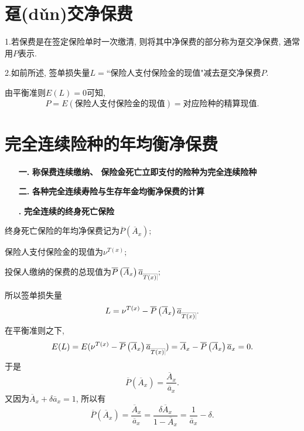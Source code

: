 \documentclass[a4paper,openany, 10pt]{ctexbook}
\makeatletter
\newcommand{\hei}{\CJKfamily{hei}}      %
\DeclareRobustCommand{\annu}[1]{_{%
    \def\arraystretch{0}%
    \setlength\arraycolsep{1pt}%
    \setlength\arrayrulewidth{.2pt}%
    \begin{array}[b]{@{}c|}\hline
        \\[\arraycolsep]%
        \scriptstyle #1%
    \end{array}%
}}
\makeatother
\begin{document}
\section{趸(dǔn)交净保费}
1.若保费是在签定保险单时一次缴清, 则将其中净保费的部分称为趸交净保费, 通常用$P$表示.

2.如前所述, 签单损失量$L=$``保险人支付保险金的现值"减去趸交净保费$P.$

由平衡准则$E(L)=0$可知, $$P=E(\text{保险人支付保险金的现值})=\text{对应险种的精算现值}.$$


\section{完全连续险种的年均衡净保费}
\begin{itemize}
    \item[{\bf\hei 一.}]{\bf\hei 称保费连续缴纳、 保险金死亡立即支付的险种为完全连续险种}
\end{itemize}
\begin{itemize}
    \item[{\bf\hei 二.}]{\bf\hei 各种完全连续寿险与生存年金均衡净保费的计算}
\end{itemize}
\begin{itemize}
  \item[{\bf\heiti 1.}] {\bf\heiti 完全连续的终身死亡保险}
\end{itemize}

\noindent 终身死亡保险的年均净保费记为$\overline{P}\left( \overline{A}_x \right);$

\noindent 保险人支付保险金的现值为$\nu^{T(x)};$

\noindent 投保人缴纳的保费的总现值为$\overline{P}\left( \overline{A}_x \right)\overline a_{\annu {T(x)}};$

\noindent 所以签单损失量$$L=\nu^{T(x)}-\overline{P}\left( \overline{A}_x \right)\overline a_{\annu {T(x)}}.$$
在平衡准则之下,
$$E(L)=E(\nu^{T(x)}-\overline{P}\left( \overline{A}_x \right)\overline a_{\annu {T(x)}})=\overline A_x-\overline{P}\left( \overline{A}_x \right)\overline a_{x}=0.$$
于是$$\overline{P}\left( \overline{A}_x \right)=\frac{\overline A_x}{\overline a_x}.$$
又因为$\overline A_x+\delta \overline a_x=1$, 所以有$$\overline{P}\left( \overline{A}_x \right)=\frac{\overline A_x}{\overline a_x}=\frac{\delta\overline A_x}{1-\overline A_x}=\frac{1}{\overline a_x}-\delta.$$
\end{document}
